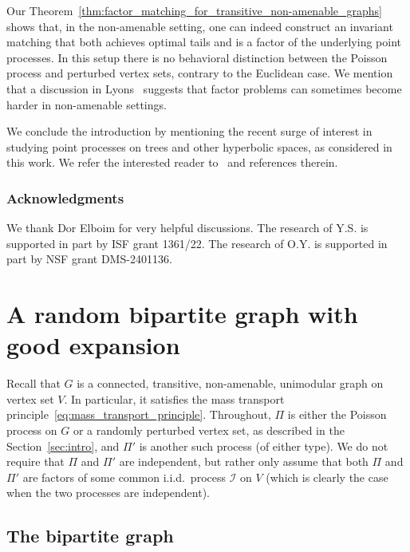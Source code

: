 \documentclass[11pt, reqno]{article}
\numberwithin{equation}{section}
\theoremstyle{definition}
\def\cI{\mathcal{I}}
\newcommand{\1}{\mathds{1}}
\begin{document}
Our Theorem~\ref{thm:factor_matching_for_transitive_non-amenable_graphs} shows that, in the non-amenable setting, one can indeed construct an invariant matching that both achieves optimal tails and is a factor of the underlying point processes. In this setup there is no behavioral distinction between the Poisson process and perturbed vertex sets, contrary to the Euclidean case. We mention that a discussion in Lyons~\cite{lyons-CPC} suggests that factor problems can sometimes become harder in non-amenable settings. 

We conclude the introduction by mentioning the recent surge of interest in studying point processes on trees and other hyperbolic spaces, as considered in this work. We refer the interested reader to~\cite{Benjamini-Krauz-Paquette, Bjorklund-Bylehn, Bylehn} and references therein.


\subsubsection*{Acknowledgments}
We thank Dor Elboim for very helpful discussions.
The research of Y.S. is supported in part by ISF grant 1361/22. The research of O.Y. is supported in part by NSF grant DMS-2401136. 

\section{A random bipartite graph with good expansion}
\label{sec:preparations}

Recall that $G$ is a connected, transitive, non-amenable, unimodular graph on vertex set $V$. In particular, it satisfies the mass transport principle~\eqref{eq:mass_transport_principle}.
Throughout, $\Pi$ is either the Poisson process on $G$ or a randomly perturbed vertex set, as described in the Section~\ref{sec:intro}, and $\Pi'$ is another such process (of either type). We do not require that $\Pi$ and $\Pi'$ are independent, but rather only assume that both $\Pi$ and $\Pi'$ are factors of some common i.i.d.\ process $\cI$ on $V$ (which is clearly the case when the two processes are independent).


\subsection{The bipartite graph}
\label{subsec:bipartite_graph}
\end{document}
